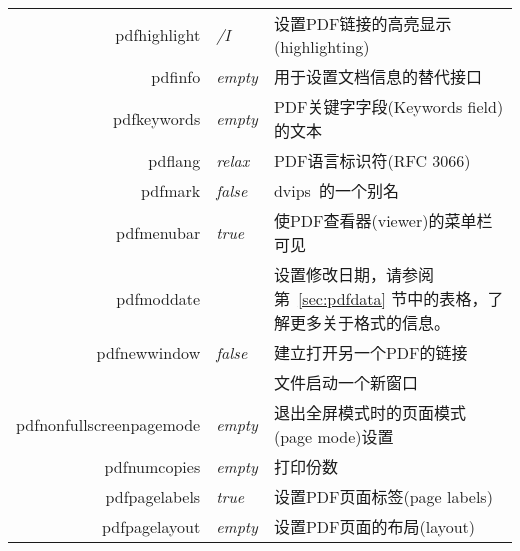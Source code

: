 \documentclass{article}
\begin{document}
\begin{longtable}{@{}>{\ttfamily}rlp{7cm}@{}}
  pdfhighlight                      & \textit{/I}            & 设置PDF链接的高亮显示(highlighting)                                                                      \\
  pdfinfo                           & \textit{empty}         & 用于设置文档信息的替代接口                                                                                   \\
  pdfkeywords                       & \textit{empty}         & PDF关键字字段(Keywords field)的文本                                                                     \\
  pdflang                           & \textit{relax}         & PDF语言标识符(RFC 3066)                                                                              \\
  pdfmark                           & \textit{false}         & \textsf{dvips}\ 的一个别名                                                                           \\
  pdfmenubar                        & \textit{true}          & 使PDF查看器(viewer)的菜单栏可见                                                                           \\
  pdfmoddate                        &                        & 设置修改日期，请参阅第~\ref{sec:pdfdata} 节中的表格，了解更多关于格式的信息。\\
  pdfnewwindow                      & \textit{false}         & 建立打开另一个PDF的链接                                                                                   \\
                                    &                        & 文件启动一个新窗口                                                                                       \\
  pdfnonfullscreenpagemode
                                    & \textit{empty}         & 退出全屏模式时的页面模式(page mode)设置                                                                       \\
  pdfnumcopies                      & \textit{empty}         & 打印份数                                                                                            \\
  pdfpagelabels                     & \textit{true}          & 设置PDF页面标签(page labels)                                                                          \\
  pdfpagelayout                     & \textit{empty}         & 设置PDF页面的布局(layout)                                                                              \\

\end{longtable}
\end{document}
